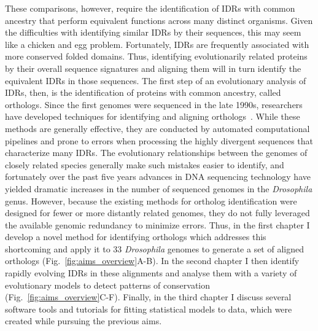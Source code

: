 These comparisons, however, require the identification of IDRs with common ancestry that perform equivalent functions across many distinct organisms. Given the difficulties with identifying similar IDRs by their sequences, this may seem like a chicken and egg problem. Fortunately, IDRs are frequently associated with more conserved folded domains. Thus, identifying evolutionarily related proteins by their overall sequence signatures and aligning them will in turn identify the equivalent IDRs in those sequences. The first step of an evolutionary analysis of IDRs, then, is the identification of proteins with common ancestry, called orthologs. Since the first genomes were sequenced in the late 1990s, researchers have developed techniques for identifying and aligning orthologs~\cite{Fleischmann1995, Goffeau1996, CESC1998, Tatusov1997}. While these methods are generally effective, they are conducted by automated computational pipelines and prone to errors when processing the highly divergent sequences that characterize many IDRs. The evolutionary relationships between the genomes of closely related species generally make such mistakes easier to identify, and fortunately over the past five years advances in DNA sequencing technology have yielded dramatic increases in the number of sequenced genomes in the \textit{Drosophila} genus. However, because the existing methods for ortholog identification were designed for fewer or more distantly related genomes, they do not fully leveraged the available genomic redundancy to minimize errors. Thus, in the first chapter I develop a novel method for identifying orthologs which addresses this shortcoming and apply it to 33 \textit{Drosophila} genomes to generate a set of aligned orthologs (Fig.~\ref{fig:aims_overview}A-B). In the second chapter I then identify rapidly evolving IDRs in these alignments and analyse them with a variety of evolutionary models to detect patterns of conservation (Fig.~\ref{fig:aims_overview}C-F). Finally, in the third chapter I discuss several software tools and tutorials for fitting statistical models to data, which were created while pursuing the previous aims.
